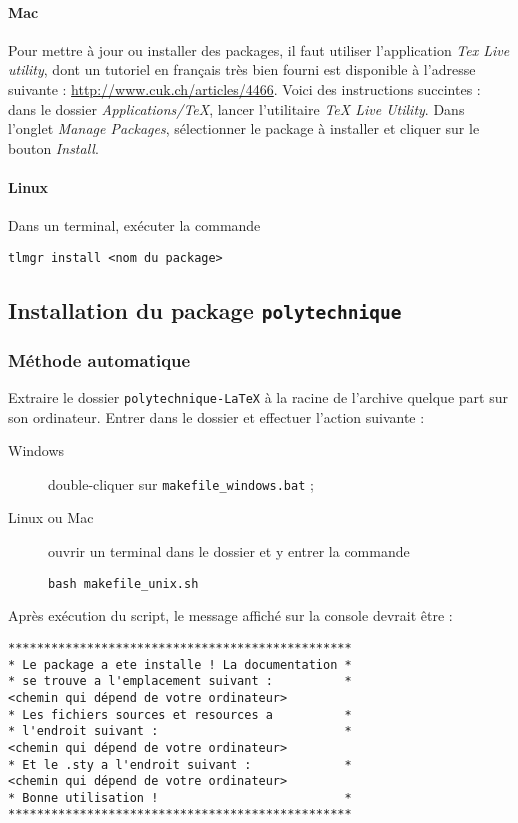 \documentclass[a4paper,12pt,twoside]{article}
\begin{document}
\paragraph{Mac} Pour mettre à jour ou installer des packages, il faut utiliser l'application \emph{Tex Live utility}, dont un tutoriel en français très bien fourni est disponible à l'adresse suivante : \url{http://www.cuk.ch/articles/4466}. Voici des instructions succintes : dans le dossier \emph{Applications/TeX}, lancer l'utilitaire \emph{TeX Live Utility}. Dans l'onglet \emph{Manage Packages}, sélectionner le package à installer et cliquer sur le bouton \emph{Install}.

\paragraph{Linux} Dans un terminal, exécuter la commande 
\begin{verbatim}
tlmgr install <nom du package>
\end{verbatim}


\subsection{Installation du package \texttt{polytechnique}}

\subsubsection{Méthode automatique}

Extraire le dossier \texttt{polytechnique-LaTeX} à la racine de l'archive quelque part sur son ordinateur. Entrer dans le dossier et effectuer l'action suivante :
\begin{description}
\item[Windows] double-cliquer sur \texttt{makefile\_windows.bat} ;
\item[Linux ou Mac] ouvrir un terminal dans le dossier et y entrer la commande
\begin{verbatim}
bash makefile_unix.sh
\end{verbatim}
\end{description}
Après exécution du script, le message affiché sur la console devrait être :
\begin{verbatim}
************************************************
* Le package a ete installe ! La documentation *
* se trouve a l'emplacement suivant :          *
<chemin qui dépend de votre ordinateur>
* Les fichiers sources et resources a          *
* l'endroit suivant :                          *
<chemin qui dépend de votre ordinateur>
* Et le .sty a l'endroit suivant :             *
<chemin qui dépend de votre ordinateur>
* Bonne utilisation !                          *
************************************************
\end{verbatim}
\end{document}
